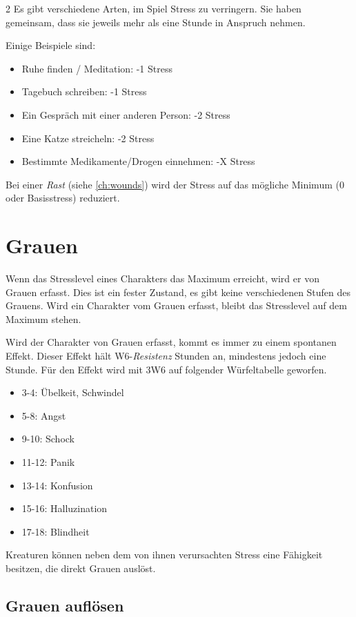 \begin{multicols}{2}
Es gibt verschiedene Arten, im Spiel Stress zu verringern. Sie haben gemeinsam, dass sie jeweils mehr als eine Stunde in Anspruch nehmen.

Einige Beispiele sind:
\begin{itemize}
    \item Ruhe finden / Meditation: -1 Stress
    \item Tagebuch schreiben: -1 Stress
    \item Ein Gespräch mit einer anderen Person: -2 Stress
    \item Eine Katze streicheln: -2 Stress
    \item Bestimmte Medikamente/Drogen einnehmen: -X Stress
\end{itemize}

Bei einer \textit{Rast} (siehe \cref{ch:wounds}) wird der Stress auf das mögliche Minimum (0 oder Basisstress) reduziert.

\section{Grauen}

Wenn das Stresslevel eines Charakters das Maximum erreicht, wird er von Grauen erfasst. Dies ist ein fester Zustand, es gibt keine verschiedenen Stufen des Grauens. Wird ein Charakter vom Grauen erfasst, bleibt das Stresslevel auf dem Maximum stehen.

Wird der Charakter von Grauen erfasst, kommt es immer zu einem spontanen Effekt. Dieser Effekt hält W6-\textit{Resistenz} Stunden an, mindestens jedoch eine Stunde. Für den Effekt wird mit 3W6 auf folgender Würfeltabelle geworfen.

\begin{itemize}
    \item 3-4: Übelkeit, Schwindel
    \item 5-8: Angst
    \item 9-10: Schock
    \item 11-12: Panik
    \item 13-14: Konfusion
    \item 15-16: Halluzination
    \item 17-18: Blindheit
\end{itemize}

Kreaturen können neben dem von ihnen verursachten Stress eine Fähigkeit besitzen, die direkt Grauen auslöst.

\subsection{Grauen auflösen}


\end{multicols}
